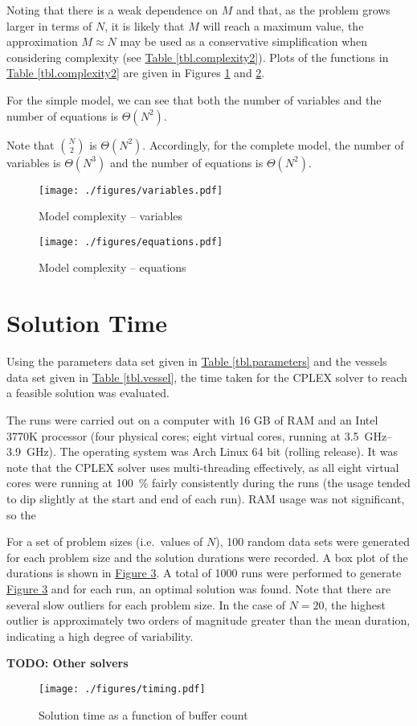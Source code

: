 Noting that there is a weak dependence on $M$ and that, as the problem
grows larger in terms of $N$, it is likely that $M$ will
reach a maximum value, the approximation $M \approx N$ may
be used as a conservative simplification when considering complexity (see
\hyperref[tbl.complexity2]{Table \ref*{tbl.complexity2}}).
Plots of the functions in
\hyperref[tbl.complexity2]{Table \ref*{tbl.complexity2}} are given in
Figures \ref{fig.dims} and \ref{fig.eqns}.


For the simple model, we can see that both the number of variables and the
number of equations is $\Theta \left( N^2 \right)$.

Note that ${{N}\choose{2}}$ is $\Theta \left( N^2 \right)$.
Accordingly, for the complete model, the number of variables is 
$\Theta \left( N^3 \right)$ and the number of equations is
$\Theta \left( N^2 \right)$.

\begin{figure}
    \centering
    \texttt{[image: ./figures/variables.pdf]}
    \caption{Model complexity -- variables}
    \label{fig.dims}
\end{figure}
\begin{figure}
    \centering
    \texttt{[image: ./figures/equations.pdf]}
    \caption{Model complexity -- equations}
    \label{fig.eqns}
\end{figure}

\section{Solution Time}\label{S.soltime}
Using the parameters data set given in 
\hyperref[tbl.parameters]{Table \ref*{tbl.parameters}} and the vessels data set
given in \hyperref[tbl.vessel]{Table \ref*{tbl.vessel}}, the time taken for
the CPLEX solver to reach a feasible solution was evaluated.

The runs were carried out on a computer with 16 GB of RAM and an Intel 3770K
processor (four physical cores; eight virtual cores, running at
 \SIrange{3.5}{3.9}{\GHz}).
The operating system was Arch Linux 64 bit (rolling release).
It was note that the CPLEX solver uses multi-threading effectively, as all eight
virtual cores were running at \SI{100}{\%} fairly consistently during the runs
(the usage tended to dip slightly at the start and end of each run).
RAM usage was not significant, so the 

For a set of problem sizes (i.e.\ values of $N$), 100 random data sets
were generated for each problem size and the solution durations were recorded.
A box plot of the durations is shown in 
\hyperref[fig.timing]{Figure \ref*{fig.timing}}.
A total of \num{1000} runs were performed to generate
\hyperref[fig.timing]{Figure \ref*{fig.timing}} and for each run, an optimal
solution was found.
Note that there are several slow outliers for each problem size.
In the case of $N=20$, the highest outlier is approximately two
orders of magnitude greater than the mean duration, indicating a high degree
of variability.

\textbf{TODO: Other solvers}

\begin{figure}
    \label{fig.timing}
    \centering
    \texttt{[image: ./figures/timing.pdf]}
    \caption{Solution time as a function of buffer count}
\end{figure}

